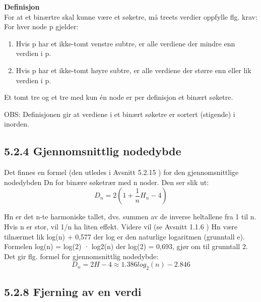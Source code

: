 \documentclass[11pt]{article}
\begin{document}
        \textbf{Definisjon}\\
        For at et binærtre skal kunne være et søketre, må treets verdier oppfylle flg. krav: 
        For hver node p gjelder:
            \begin{enumerate}
                \item Hvis p har et ikke-tomt venstre
                    subtre, er alle verdiene der mindre enn verdien i p.
                \item Hvis p har et ikke-tomt
                    høyre subtre, er alle verdiene der større enn eller lik verdien i p.
            \end{enumerate}
        Et tomt tre og et tre med kun én node er per definisjon et binært søketre.

        OBS: Definisjonen gir at verdiene i et binært søketre er sortert (stigende) i inorden. 

    \subsection{5.2.4 Gjennomsnittlig nodedybde}
        Det finnes en formel (den utledes i Avsnitt 5.2.15 ) for den gjennomsnittlige nodedybden Dn
        for binære søketrær med n noder. Den ser slik ut: 
            \[
                D_n = 2(1+\frac{1}{n}H_n-4)
            \]

        Hn er det n-te harmoniske tallet, dvs. summen av de inverse heltallene fra 1 til n. Hvis n er
        stor, vil 1/n ha liten effekt. Videre vil (se Avsnitt 1.1.6 ) Hn være tilnærmet lik log(n) + 0,577
        der log er den naturlige logaritmen (grunntall e). Formelen log(n) = log(2) · log2(n) der log(2)
        = 0,693, gjør om til grunntall 2. Det gir flg. formel for gjennomsnittlig nodedybde:
            \[
                D_n = 2H-4 \approx 1.386log_2(n)-2.846
            \]

    \subsection{5.2.8 Fjerning av en verdi}
\end{document}

